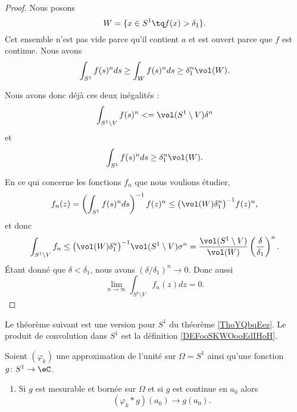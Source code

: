 \begin{proof}
	Nous posons
	\begin{equation}
		W=\{ x\in S^1\tq f(x)>\delta_1 \}.
	\end{equation}
	Cet ensemble n'est pas vide parce qu'il contient \( a\) et est ouvert parce que \( f\) est continue. Nous avons
	\begin{equation}
		\int_{S^1}f(s)^nds\geq \int_{W}f(s)^nds\geq \delta_1^n\vol(W).
	\end{equation}

	Nous avons donc déjà ces deux inégalités :
	\begin{equation}
		\int_{S^1\setminus V}f(s)^n<=\vol(S^1\setminus V)\delta^n
	\end{equation}
	et
	\begin{equation}
		\int_{S^1}f(s)^nds\geq \delta_1^n\vol(W).
	\end{equation}

	En ce qui concerne les fonctions \( f_n\) que nous voulions étudier,
	\begin{equation}
		f_n(z)=\left( \int_{S^1}f(s)^nds \right)^{-1}f(z)^n\leq \big( \vol(W)\delta_1^n \big)^{-1}f(z)^n,
	\end{equation}
	et donc
	\begin{equation}
		\int_{S^1\setminus V}f_n\leq\big( \vol(W)\delta_1^n \big)^{-1}\vol(S^1\setminus V)\sigma^n=\frac{ \vol(S^1\setminus V) }{ \vol(W) }\left( \frac{ \delta }{ \delta_1 } \right)^n.
	\end{equation}
	Étant donné que \( \delta<\delta_1\), nous avons \( (\delta/\delta_1)^n\to 0\). Donc aussi
	\begin{equation}
		\lim_{n\to \infty} \int_{S^1\setminus V}f_n(z)dz=0.
	\end{equation}
\end{proof}

Le théorème suivant est une version pour \( S^1\) du théorème \ref{ThoYQbqEez}. Le produit de convolution dans \( S^1\) est la définition \ref{DEFooSKWOooEdIHoH}.
\begin{theorem}         \label{THOooIAOPooELSNxq}
	Soient \( (\varphi_k)\) une approximation de l'unité sur \( \Omega=S^1\) ainsi qu'une fonction \( g\colon S^1\to \eC\).
	\begin{enumerate}
		\item       \label{ITEMooNUDFooYLFIwR}
		      Si \( g\) est mesurable et bornée sur \( \Omega\) et si \( g\) est continue en \( a_0\) alors
		      \begin{equation}
			      (\varphi_k*g)(a_0)\to g(a_0).
		      \end{equation}
	\end{enumerate}
\end{theorem}

